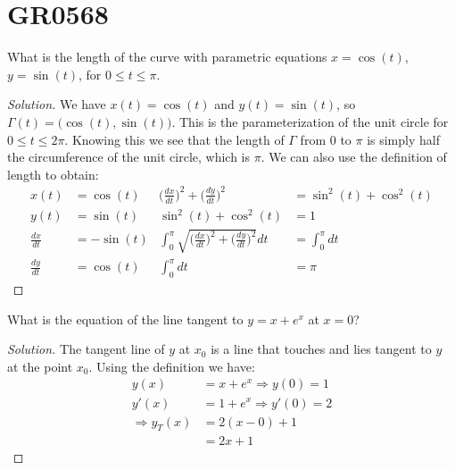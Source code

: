 \documentclass[crop=false,class=book]{standalone}
\begin{document}
    \section{GR0568}
        \begin{problem}
            What is the length of the curve with parametric equations
            $x=\cos(t)$, $y=\sin(t)$, for $0\leq t\leq\pi$.
        \end{problem}
        \begin{proof}[Solution]
            We have $x(t)=\cos(t)$ and $y(t)=\sin(t)$, so
            $\Gamma(t)=\big(\cos(t),\sin(t)\big)$. This is the
            parameterization of the unit circle for
            $0\leq t\leq 2\pi$. Knowing this we see that the length
            of $\Gamma$ from $0$ to $\pi$ is simply half the
            circumference of the unit circle, which is $\pi$. We can
            also use the definition of length to obtain:
            \begin{align*}
                x(t)&=\cos(t)&
                \Big(\frac{dx}{dt}\Big)^{2}+
                \Big(\frac{dy}{dt}\Big)^{2}
                &=\sin^{2}(t)+\cos^{2}(t)\\                
                y(t)&=\sin(t)
                &\sin^{2}(t)+\cos^{2}(t)&=1\\
                \frac{dx}{dt}&=-\sin(t)
                &\int_{0}^{\pi}\sqrt{\Big(\frac{dx}{dt}\Big)^{2}+
                \Big(\frac{dy}{dt}\Big)^{2}}dt
                &=\int_{0}^{\pi}dt\\
                \frac{dy}{dt}&=\cos(t)&
                \int_{0}^{\pi}dt&=\pi
            \end{align*}
        \end{proof}
        \begin{problem}
            What is the equation of the line tangent to $y=x+e^x$
            at $x=0$?
        \end{problem}
        \begin{proof}[Solution]
            The tangent line of $y$ at $x_{0}$ is a line that touches
            and lies tangent to $y$ at the point $x_{0}$. Using the
            definition we have:
            \begin{align*}
                y(x)&=x+e^{x}\Rightarrow y(0)=1\\
                y'(x)&=1+e^{x}\Rightarrow y'(0)=2\\
                \Rightarrow y_{T}(x)&=2(x-0)+1\\
                &=2x+1
            \end{align*}
        \end{proof}
\end{document}
